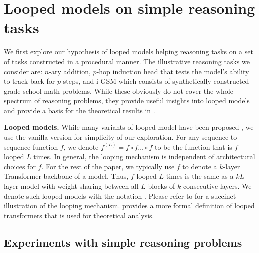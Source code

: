 \section{Looped models on simple reasoning tasks}
\label{sec:synthetic_reasoning}

\vspace{-0.05in}
We first explore our hypothesis of looped models helping reasoning tasks on a set of  tasks constructed in a procedural manner. The illustrative reasoning tasks we consider are: $n$-ary addition, $p$-hop induction head that tests the model's ability to track back for $p$ steps, and i-GSM which consists of synthetically constructed grade-school math problems. While these obviously do not cover the whole spectrum of reasoning problems, they provide useful insights into looped models and provide a basis for the theoretical results in .

\textbf{Looped models.} While many variants of looped model have been proposed \citep{lan2019albert,dehghani2018universal,giannou2023looped,yang2023looped,mohtashami2023cotformer}, we use the vanilla version for simplicity of our exploration. For any sequence-to-sequence function $f$, we denote $f^{(L)} = f \circ f \dots \circ f$ to be the function that is $f$ looped $L$ times. In general, the looping mechanism is independent of architectural choices for $f$.
For the rest of the paper, we typically use $f$ to denote a $k$-layer Transformer backbone of a model.
Thus, $f$ looped $L$ times is the same as a $kL$ layer model with weight sharing between all $L$ blocks of $k$ consecutive layers.
We denote such looped models with the notation .
Please refer to  for a succinct illustration of the looping mechanism.
 provides a more formal definition of looped transformers that is used for theoretical analysis.





\subsection{Experiments with simple reasoning problems}
\label{sec:addition}

